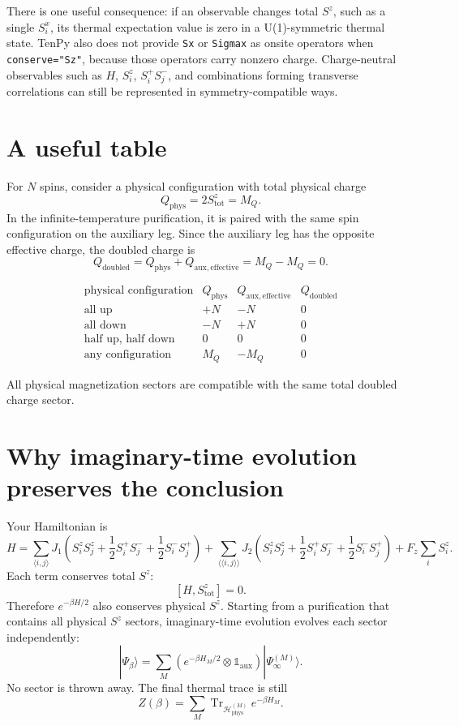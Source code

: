 \documentclass[11pt]{article}
\newcommand{\Tr}{\operatorname{Tr}}
\newcommand{\Id}{\mathbb{1}}
\newcommand{\Hphys}{\mathcal{H}_{\mathrm{phys}}}
\newcommand{\Q}{Q}
\begin{document}
There is one useful consequence: if an observable changes total \(S^z\), such
as a single \(S^x_i\), its thermal expectation value is zero in a
U(1)-symmetric thermal state. TenPy also does not provide \texttt{Sx} or
\texttt{Sigmax} as onsite operators when \texttt{conserve="Sz"}, because those
operators carry nonzero charge. Charge-neutral observables such as \(H\),
\(S^z_i\), \(S_i^+S_j^-\), and combinations forming transverse correlations can
still be represented in symmetry-compatible ways.

\section{A useful table}

For \(N\) spins, consider a physical configuration with total physical charge
\[
\Q_{\mathrm{phys}} = 2S^z_{\mathrm{tot}} = M_Q.
\]
In the infinite-temperature purification, it is paired with the same spin
configuration on the auxiliary leg. Since the auxiliary leg has the opposite
effective charge, the doubled charge is
\[
\Q_{\mathrm{doubled}}
= \Q_{\mathrm{phys}} + \Q_{\mathrm{aux,effective}}
= M_Q - M_Q = 0.
\]

\[
\begin{array}{c|c|c|c}
\text{physical configuration} &
\Q_{\mathrm{phys}} &
\Q_{\mathrm{aux,effective}} &
\Q_{\mathrm{doubled}} \\
\hline
\text{all up} & +N & -N & 0 \\
\text{all down} & -N & +N & 0 \\
\text{half up, half down} & 0 & 0 & 0 \\
\text{any configuration} & M_Q & -M_Q & 0
\end{array}
\]

All physical magnetization sectors are compatible with the same total doubled
charge sector.

\section{Why imaginary-time evolution preserves the conclusion}

Your Hamiltonian is
\[
H
= \sum_{\langle i,j\rangle}
J_1
\left(
S_i^zS_j^z
+ \frac{1}{2}S_i^+S_j^-
+ \frac{1}{2}S_i^-S_j^+
\right)
+ \sum_{\langle\langle i,j\rangle\rangle}
J_2
\left(
S_i^zS_j^z
+ \frac{1}{2}S_i^+S_j^-
+ \frac{1}{2}S_i^-S_j^+
\right)
+ F_z\sum_i S_i^z.
\]
Each term conserves total \(S^z\):
\[
[H,S^z_{\mathrm{tot}}]=0.
\]
Therefore \(e^{-\beta H/2}\) also conserves physical \(S^z\). Starting from a
purification that contains all physical \(S^z\) sectors, imaginary-time
evolution evolves each sector independently:
\[
|\Psi_\beta\rangle
= \sum_M
\left(e^{-\beta H_M/2}\otimes \Id_{\mathrm{aux}}\right)
|\Psi_{\infty}^{(M)}\rangle.
\]
No sector is thrown away. The final thermal trace is still
\[
Z(\beta)=\sum_M \Tr_{\Hphys^{(M)}}e^{-\beta H_M}.
\]
\end{document}
